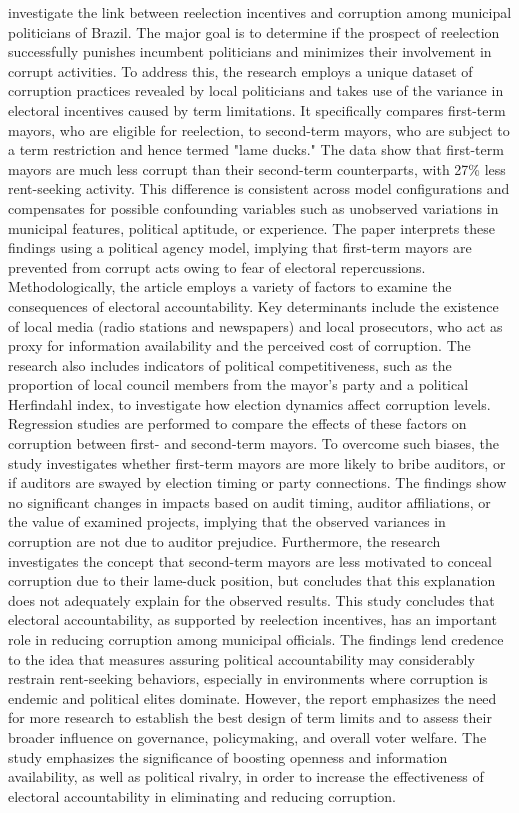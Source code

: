  investigate the link between reelection incentives and corruption among municipal politicians of Brazil. The major goal is to determine if the prospect of reelection successfully punishes incumbent politicians and minimizes their involvement in corrupt activities. To address this, the research employs a unique dataset of corruption practices revealed by local politicians and takes use of the variance in electoral incentives caused by term limitations. It specifically compares first-term mayors, who are eligible for reelection, to second-term mayors, who are subject to a term restriction and hence termed "lame ducks." The data show that first-term mayors are much less corrupt than their second-term counterparts, with 27\% less rent-seeking activity. This difference is consistent across model configurations and compensates for possible confounding variables such as unobserved variations in municipal features, political aptitude, or experience. The paper interprets these findings using a political agency model, implying that first-term mayors are prevented from corrupt acts owing to fear of electoral repercussions. Methodologically, the article employs a variety of factors to examine the consequences of electoral accountability. Key determinants include the existence of local media (radio stations and newspapers) and local prosecutors, who act as proxy for information availability and the perceived cost of corruption. The research also includes indicators of political competitiveness, such as the proportion of local council members from the mayor's party and a political Herfindahl index, to investigate how election dynamics affect corruption levels. Regression studies are performed to compare the effects of these factors on corruption between first- and second-term mayors. To overcome such biases, the study investigates whether first-term mayors are more likely to bribe auditors, or if auditors are swayed by election timing or party connections. The findings show no significant changes in impacts based on audit timing, auditor affiliations, or the value of examined projects, implying that the observed variances in corruption are not due to auditor prejudice. Furthermore, the research investigates the concept that second-term mayors are less motivated to conceal corruption due to their lame-duck position, but concludes that this explanation does not adequately explain for the observed results. This study concludes that electoral accountability, as supported by reelection incentives, has an important role in reducing corruption among municipal officials. The findings lend credence to the idea that measures assuring political accountability may considerably restrain rent-seeking behaviors, especially in environments where corruption is endemic and political elites dominate. However, the report emphasizes the need for more research to establish the best design of term limits and to assess their broader influence on governance, policymaking, and overall voter welfare. The study emphasizes the significance of boosting openness and information availability, as well as political rivalry, in order to increase the effectiveness of electoral accountability in eliminating and reducing corruption. \\

